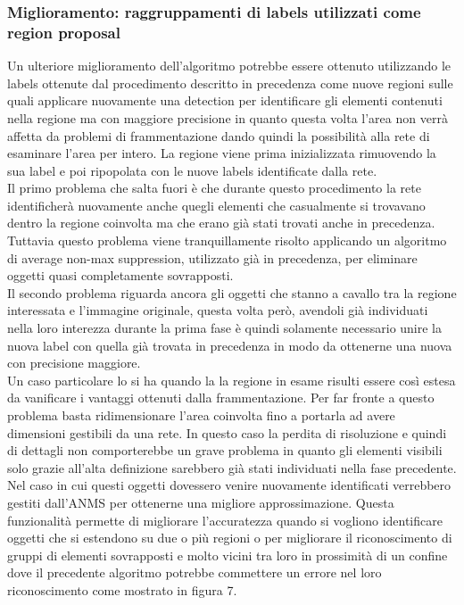 \subsubsection{Miglioramento: raggruppamenti di labels utilizzati come region proposal}
Un ulteriore miglioramento dell'algoritmo potrebbe essere ottenuto utilizzando le labels ottenute dal procedimento descritto in precedenza come nuove regioni sulle quali applicare nuovamente una detection per identificare gli elementi contenuti nella regione ma con maggiore precisione in quanto questa volta l'area non verrà affetta da problemi di frammentazione dando quindi la possibilità alla rete di esaminare l'area per intero. La regione viene prima inizializzata rimuovendo la sua label e poi ripopolata con le nuove labels identificate dalla rete.\\
Il primo problema che salta fuori è che durante questo procedimento la rete identificherà nuovamente anche quegli elementi che casualmente si trovavano dentro la regione coinvolta ma che erano già stati trovati anche in precedenza. Tuttavia questo problema viene tranquillamente risolto applicando un algoritmo di average non-max suppression, utilizzato già in precedenza, per eliminare oggetti quasi completamente sovrapposti.\\
Il secondo problema riguarda ancora gli oggetti che stanno a cavallo tra la regione interessata e l'immagine originale, questa volta però, avendoli già individuati nella loro interezza durante la prima fase è quindi solamente necessario unire la nuova label con quella già trovata in precedenza in modo da ottenerne una nuova con precisione maggiore.\\
Un caso particolare lo si ha quando la la regione in esame risulti essere così estesa da vanificare i vantaggi ottenuti dalla frammentazione. Per far fronte a questo problema basta ridimensionare l'area coinvolta fino a portarla ad avere dimensioni gestibili da una rete. In questo caso la perdita di risoluzione e quindi di dettagli non comporterebbe un grave problema in quanto gli elementi visibili solo grazie all'alta definizione sarebbero già stati individuati nella fase precedente. Nel caso in cui questi oggetti dovessero venire nuovamente identificati verrebbero gestiti dall'ANMS per ottenerne una migliore approssimazione. Questa funzionalità permette di migliorare l'accuratezza quando si vogliono identificare oggetti che si estendono su due o più regioni o per migliorare il riconoscimento di gruppi di elementi sovrapposti e molto vicini tra loro in prossimità di un confine dove il precedente algoritmo potrebbe commettere un errore nel loro riconoscimento come mostrato in figura 7.
